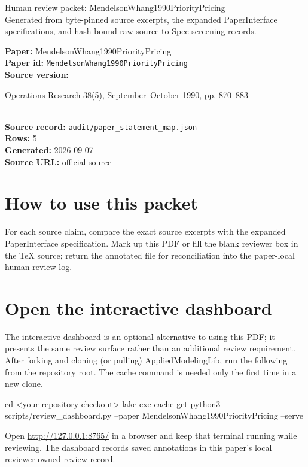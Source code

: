 \documentclass[10pt]{article}
\begin{document}
\fontsize{9}{10}\selectfont

\begin{center}
{\LARGE Human review packet: MendelsonWhang1990PriorityPricing}\\[0.35em]
\small Generated from byte-pinned source excerpts, the expanded PaperInterface
specifications, and hash-bound raw-source-to-Spec screening records.
\end{center}

\noindent\textbf{Paper:} MendelsonWhang1990PriorityPricing\\
\textbf{Paper id:} \texttt{MendelsonWhang1990PriorityPricing}\\
\textbf{Source version:} \parbox[t]{0.76\linewidth}{\raggedright Operations Research 38(5), September--October 1990, pp. 870--883}\\
\textbf{Source record:} \texttt{audit/paper\_statement\_map.json}\\
\textbf{Rows:} 5\\
\textbf{Generated:} 2026-09-07\\
\textbf{Source URL:} \href{https://pubsonline.informs.org/doi/10.1287/opre.38.5.870}{official source}





\section*{How to use this packet}
For each source claim, compare the exact source excerpts with the expanded
PaperInterface specification. Mark up this PDF or fill the blank reviewer box in the TeX source;
return the annotated file for reconciliation into the paper-local human-review
log.

\section*{Open the interactive dashboard}
The interactive dashboard is an optional alternative to using this PDF; it
presents the same review surface rather than an additional review requirement.
After forking and cloning (or pulling) AppliedModelingLib, run the following from the
repository root. The cache command is needed only the first time in a new clone.
\begin{ReviewVerbatim}
cd <your-repository-checkout>
lake exe cache get
python3 scripts/review_dashboard.py --paper MendelsonWhang1990PriorityPricing --serve
\end{ReviewVerbatim}
Open \url{http://127.0.0.1:8765/} in a browser and keep that terminal running
while reviewing. The dashboard records saved annotations in this paper's local
reviewer-owned review record.
\end{document}
